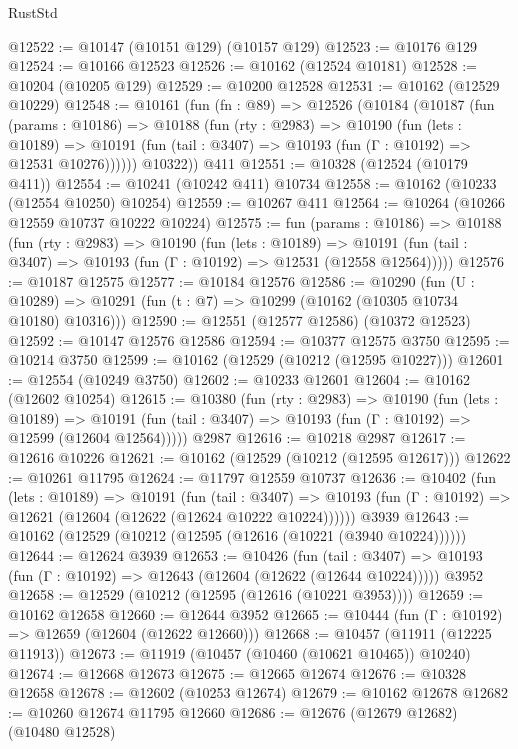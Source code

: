 \begin{lexlean}{RustStd}
\begin{coremodule}
@12522 := @10147 (@10151 @129) (@10157 @129)
@12523 := @10176 @129
@12524 := @10166 @12523
@12526 := @10162 (@12524 @10181)
@12528 := @10204 (@10205 @129)
@12529 := @10200 @12528
@12531 := @10162 (@12529 @10229)
@12548 := @10161
    (fun (fn : @89) =>
    @12526
      (@10184
        (@10187
          (fun (params : @10186) =>
          @10188
            (fun (rty : @2983) =>
            @10190
              (fun (lets : @10189) =>
              @10191 (fun (tail : @3407) => @10193 (fun (Γ : @10192) => @12531 @10276))))))
        @10322))
    @411
@12551 := @10328 (@12524 (@10179 @411))
@12554 := @10241 (@10242 @411) @10734
@12558 := @10162 (@10233 (@12554 @10250) @10254)
@12559 := @10267 @411
@12564 := @10264 (@10266 @12559 @10737 @10222 @10224)
@12575 := fun (params : @10186) =>
  @10188
    (fun (rty : @2983) =>
    @10190
      (fun (lets : @10189) =>
      @10191 (fun (tail : @3407) => @10193 (fun (Γ : @10192) => @12531 (@12558 @12564)))))
@12576 := @10187 @12575
@12577 := @10184 @12576
@12586 := @10290
    (fun (U : @10289) => @10291 (fun (t : @7) => @10299 (@10162 (@10305 @10734 @10180) @10316)))
@12590 := @12551 (@12577 @12586) (@10372 @12523)
@12592 := @10147 @12576 @12586
@12594 := @10377 @12575 @3750
@12595 := @10214 @3750
@12599 := @10162 (@12529 (@10212 (@12595 @10227)))
@12601 := @12554 (@10249 @3750)
@12602 := @10233 @12601
@12604 := @10162 (@12602 @10254)
@12615 := @10380
    (fun (rty : @2983) =>
    @10190
      (fun (lets : @10189) =>
      @10191 (fun (tail : @3407) => @10193 (fun (Γ : @10192) => @12599 (@12604 @12564)))))
    @2987
@12616 := @10218 @2987
@12617 := @12616 @10226
@12621 := @10162 (@12529 (@10212 (@12595 @12617)))
@12622 := @10261 @11795
@12624 := @11797 @12559 @10737
@12636 := @10402
    (fun (lets : @10189) =>
    @10191
      (fun (tail : @3407) =>
      @10193 (fun (Γ : @10192) => @12621 (@12604 (@12622 (@12624 @10222 @10224))))))
    @3939
@12643 := @10162 (@12529 (@10212 (@12595 (@12616 (@10221 (@3940 @10224))))))
@12644 := @12624 @3939
@12653 := @10426
    (fun (tail : @3407) => @10193 (fun (Γ : @10192) => @12643 (@12604 (@12622 (@12644 @10224)))))
    @3952
@12658 := @12529 (@10212 (@12595 (@12616 (@10221 @3953))))
@12659 := @10162 @12658
@12660 := @12644 @3952
@12665 := @10444 (fun (Γ : @10192) => @12659 (@12604 (@12622 @12660)))
@12668 := @10457 (@11911 (@12225 @11913))
@12673 := @11919 (@10457 (@10460 (@10621 @10465)) @10240)
@12674 := @12668 @12673
@12675 := @12665 @12674
@12676 := @10328 @12658
@12678 := @12602 (@10253 @12674)
@12679 := @10162 @12678
@12682 := @10260 @12674 @11795 @12660
@12686 := @12676 (@12679 @12682) (@10480 @12528)

\end{coremodule}
\end{lexlean}

